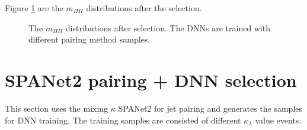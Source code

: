 \documentclass[12pt]{article}
\begin{document}
		Figure \ref{fig:mhh_distributions} are the $m_{HH}$ distributions after the selection.
		\begin{figure}[htpb]
			\centering
			\caption{The $m_{H H}$ distributions after selection. The DNNs are trained with different pairing method samples.}
			\label{fig:mhh_distributions}
		\end{figure}
		
\section{SPANet2 pairing + DNN selection}%
\label{sec:spanet2_pairing_dnn_selection}
	This section uses the mixing $\kappa$ SPANet2 for jet pairing and generates the samples for DNN training. The training samples are consisted of different $\kappa_\lambda$ value events.
\end{document}
